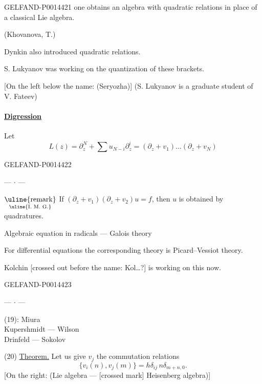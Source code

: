 \begin{GelfandAdjacentEvidence}{GELFAND-P001442}{1}
 one obtains an algebra with quadratic relations in place of a classical Lie algebra.

(Khovanova, T.)

Dynkin also introduced quadratic relations.

S. Lukyanov was working on the quantization of these brackets.

[On the left below the name: (Seryozha)]
(S. Lukyanov is a graduate student of V. Fateev)

\paragraph*{\uline{Digression}}
 Let
\begin{equation*}
L(z)=\partial_z^N+\sum u_{N-i}\partial_z^i
=(\partial_z+v_1)\ldots(\partial_z+v_N) \tag{19}
\end{equation*}
\end{GelfandAdjacentEvidence}
\begin{GelfandAdjacentEvidence}{GELFAND-P001442}{2}

\begin{center}— \(\cdot\) —\end{center}
\(\underset{\text{\uline{I. M. G.}}}{\text{\uline{remark}}}\)\qquad
If \((\partial_z+v_1)(\partial_z+v_2)u=f\), then \(u\) is obtained by quadratures.

Algebraic equation in radicals — Galois theory

For differential equations the corresponding theory is Picard–Vessiot theory.

Kolchin [crossed out before the name: Kol…?] is working on this now.
\end{GelfandAdjacentEvidence}
\begin{GelfandAdjacentEvidence}{GELFAND-P001442}{3}


\begin{center}— \(\cdot\) —\end{center}

 (19): Miura\\
\hspace*{3em}Kupershmidt — Wilson\\
\hspace*{3em}Drinfeld — Sokolov

(20) \uline{Theorem.} Let us give \(v_j\) the commutation relations
\begin{equation*}
\{v_i(n),v_j(m)\}=h\delta_{ij}\,n\delta_{m+n,0} . \tag{21}
\end{equation*}
[On the right: (Lie algebra — [crossed mark] Heisenberg algebra)]
\end{GelfandAdjacentEvidence}
